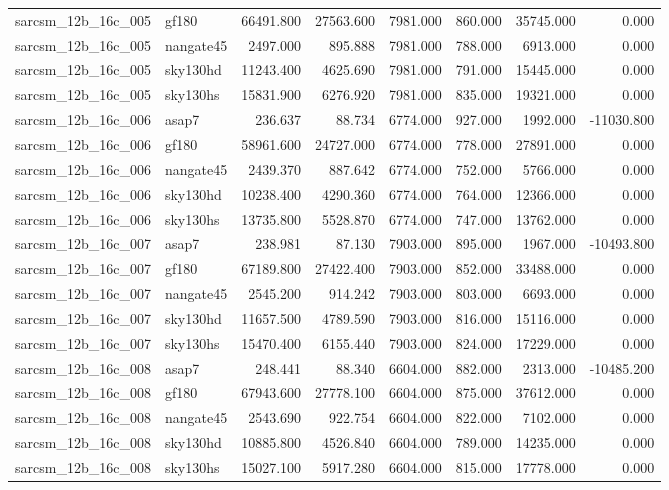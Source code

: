 \begin{tabular}{llrrrrrr}
sarcsm\_12b\_16c\_005 & gf180 & 66491.800 & 27563.600 & 7981.000 & 860.000 & 35745.000 & 0.000 \\
sarcsm\_12b\_16c\_005 & nangate45 & 2497.000 & 895.888 & 7981.000 & 788.000 & 6913.000 & 0.000 \\
sarcsm\_12b\_16c\_005 & sky130hd & 11243.400 & 4625.690 & 7981.000 & 791.000 & 15445.000 & 0.000 \\
sarcsm\_12b\_16c\_005 & sky130hs & 15831.900 & 6276.920 & 7981.000 & 835.000 & 19321.000 & 0.000 \\
sarcsm\_12b\_16c\_006 & asap7 & 236.637 & 88.734 & 6774.000 & 927.000 & 1992.000 & -11030.800 \\
sarcsm\_12b\_16c\_006 & gf180 & 58961.600 & 24727.000 & 6774.000 & 778.000 & 27891.000 & 0.000 \\
sarcsm\_12b\_16c\_006 & nangate45 & 2439.370 & 887.642 & 6774.000 & 752.000 & 5766.000 & 0.000 \\
sarcsm\_12b\_16c\_006 & sky130hd & 10238.400 & 4290.360 & 6774.000 & 764.000 & 12366.000 & 0.000 \\
sarcsm\_12b\_16c\_006 & sky130hs & 13735.800 & 5528.870 & 6774.000 & 747.000 & 13762.000 & 0.000 \\
sarcsm\_12b\_16c\_007 & asap7 & 238.981 & 87.130 & 7903.000 & 895.000 & 1967.000 & -10493.800 \\
sarcsm\_12b\_16c\_007 & gf180 & 67189.800 & 27422.400 & 7903.000 & 852.000 & 33488.000 & 0.000 \\
sarcsm\_12b\_16c\_007 & nangate45 & 2545.200 & 914.242 & 7903.000 & 803.000 & 6693.000 & 0.000 \\
sarcsm\_12b\_16c\_007 & sky130hd & 11657.500 & 4789.590 & 7903.000 & 816.000 & 15116.000 & 0.000 \\
sarcsm\_12b\_16c\_007 & sky130hs & 15470.400 & 6155.440 & 7903.000 & 824.000 & 17229.000 & 0.000 \\
sarcsm\_12b\_16c\_008 & asap7 & 248.441 & 88.340 & 6604.000 & 882.000 & 2313.000 & -10485.200 \\
sarcsm\_12b\_16c\_008 & gf180 & 67943.600 & 27778.100 & 6604.000 & 875.000 & 37612.000 & 0.000 \\
sarcsm\_12b\_16c\_008 & nangate45 & 2543.690 & 922.754 & 6604.000 & 822.000 & 7102.000 & 0.000 \\
sarcsm\_12b\_16c\_008 & sky130hd & 10885.800 & 4526.840 & 6604.000 & 789.000 & 14235.000 & 0.000 \\
sarcsm\_12b\_16c\_008 & sky130hs & 15027.100 & 5917.280 & 6604.000 & 815.000 & 17778.000 & 0.000 \\

\end{tabular}
